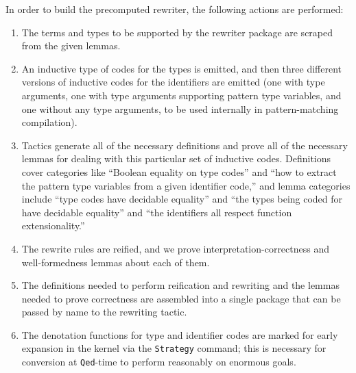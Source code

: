 \documentclass[a4paper,USenglish,cleveref,autoref,thm-restate]{lipics-v2021}
\begin{document}
\begin{minipage}[t][1cm]{\textwidth}
In order to build the precomputed rewriter, the following actions are performed:
\begin{enumerate}
    \item
    The terms and types to be supported by the rewriter package are scraped from the given lemmas.
    \item
    An inductive type of codes for the types is emitted, and then three different versions of inductive codes for the identifiers are emitted (one with type arguments, one with type arguments supporting pattern type variables, and one without any type arguments, to be used internally in pattern-matching compilation).
    \item
    Tactics generate all of the necessary definitions and prove all of the necessary lemmas for dealing with this particular set of inductive codes.
    Definitions cover categories like ``Boolean equality on type codes'' and ``how to extract the pattern type variables from a given identifier code,'' and lemma categories include ``type codes have decidable equality'' and ``the types being coded for have decidable equality'' and ``the identifiers all respect function extensionality.''
    \item
    The rewrite rules are reified, and we prove interpretation-correctness and well-formedness lemmas about each of them.
    \item
    The definitions needed to perform reification and rewriting and the lemmas needed to prove correctness are assembled into a single package that can be passed by name to the rewriting tactic.
    \item
    The denotation functions for type and identifier codes are marked for early expansion in the kernel via the \texttt{Strategy} command;
    this is necessary for conversion at \texttt{Qed}-time to perform reasonably on enormous goals.
\end{enumerate}


\end{minipage}
\end{document}
